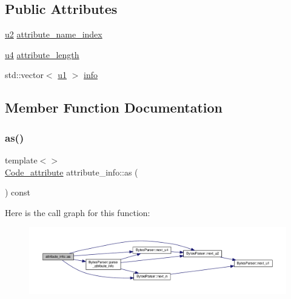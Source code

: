 \subsection*{Public Attributes}
\begin{DoxyCompactItemize}
\item 
\hyperlink{types_8h_ae676e9207f57fb921dca7366b2f59c53}{u2} \hyperlink{structattribute__info_a19df9d4b42eb55ca5dc1bed98df89378}{attribute\+\_\+name\+\_\+index}
\item 
\hyperlink{types_8h_af3b2d4b29fd9faedc984db3e062b3d5d}{u4} \hyperlink{structattribute__info_a1ed8f679458c4bb0ed3315721588f50d}{attribute\+\_\+length}
\item 
std\+::vector$<$ \hyperlink{types_8h_a162f47a77ee24f6f77cd8c82ccd40ab7}{u1} $>$ \hyperlink{structattribute__info_a6a539f32a00eeace6eea454ca37768fd}{info}
\end{DoxyCompactItemize}


\subsection{Member Function Documentation}
\mbox{\label{structattribute__info_a22251f0b4f95aabf0fc722ca80651d88}} 
\subsubsection{\texorpdfstring{as()}{as()}\hspace{0.1cm}{\footnotesize\ttfamily [1/2]}}
{\footnotesize\ttfamily template$<$$>$ \\
\hyperlink{structCode__attribute}{Code\+\_\+attribute} attribute\+\_\+info\+::as (\begin{DoxyParamCaption}{ }\end{DoxyParamCaption}) const}

Here is the call graph for this function\+:
\nopagebreak
\begin{figure}[H]
\begin{center}
\leavevmode
\includegraphics[width=350pt]{structattribute__info_a22251f0b4f95aabf0fc722ca80651d88_cgraph}
\end{center}
\end{figure}
\mbox{\label{structattribute__info_ace33b133435450d7d161751a3393de11}} 
